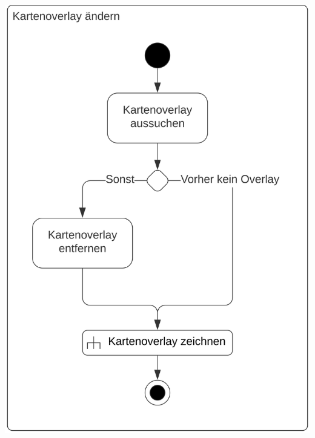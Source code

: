\begin{center}
\includegraphics[scale=0.19]{media/activity-usage/KartenoverlayAendern} 

\clearpage


\end{center}
